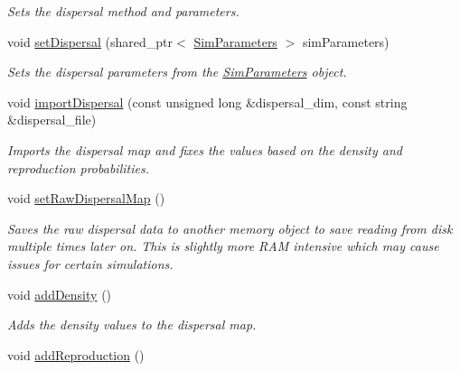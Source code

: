 \begin{DoxyCompactItemize}
\begin{DoxyCompactList}\small\item\em Sets the dispersal method and parameters. \end{DoxyCompactList}\item 
void \hyperlink{class_dispersal_coordinator_a13809695dbf175d765464331c2b8d134}{set\+Dispersal} (shared\+\_\+ptr$<$ \hyperlink{struct_sim_parameters}{Sim\+Parameters} $>$ sim\+Parameters)
\begin{DoxyCompactList}\small\item\em Sets the dispersal parameters from the \hyperlink{struct_sim_parameters}{Sim\+Parameters} object. \end{DoxyCompactList}\item 
void \hyperlink{class_dispersal_coordinator_afe53c51858899e9918e95ff120813fa8}{import\+Dispersal} (const unsigned long \&dispersal\+\_\+dim, const string \&dispersal\+\_\+file)
\begin{DoxyCompactList}\small\item\em Imports the dispersal map and fixes the values based on the density and reproduction probabilities. \end{DoxyCompactList}\item 
void \hyperlink{class_dispersal_coordinator_a87155f185490f98569723eb867440c51}{set\+Raw\+Dispersal\+Map} ()\hypertarget{class_dispersal_coordinator_a87155f185490f98569723eb867440c51}{}\label{class_dispersal_coordinator_a87155f185490f98569723eb867440c51}

\begin{DoxyCompactList}\small\item\em Saves the raw dispersal data to another memory object to save reading from disk multiple times later on. This is slightly more R\+AM intensive which may cause issues for certain simulations. \end{DoxyCompactList}\item 
void \hyperlink{class_dispersal_coordinator_af73768c49f869a89cccaa203e7b6e423}{add\+Density} ()
\begin{DoxyCompactList}\small\item\em Adds the density values to the dispersal map. \end{DoxyCompactList}\item 
void \hyperlink{class_dispersal_coordinator_a4f3c173f02fc9fcfad73a5cc470e7994}{add\+Reproduction} ()\hypertarget{class_dispersal_coordinator_a4f3c173f02fc9fcfad73a5cc470e7994}{}\label{class_dispersal_coordinator_a4f3c173f02fc9fcfad73a5cc470e7994}


\end{DoxyCompactItemize}
